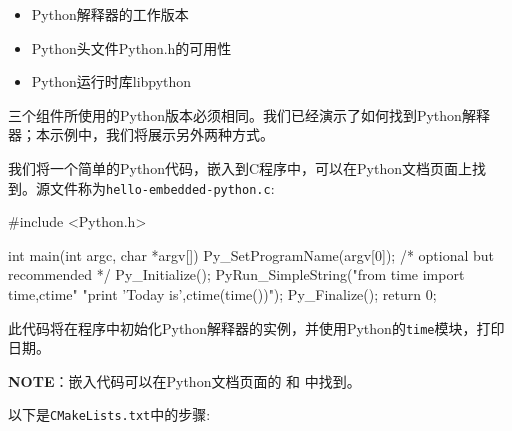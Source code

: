 \begin{itemize}
\item Python解释器的工作版本

\item Python头文件Python.h的可用性

\item Python运行时库libpython

\end{itemize}

三个组件所使用的Python版本必须相同。我们已经演示了如何找到Python解释器；本示例中，我们将展示另外两种方式。


我们将一个简单的Python代码，嵌入到C程序中，可以在Python文档页面上找到。源文件称为\texttt{hello-embedded-python.c}:

\begin{codebox}[c]
#include <Python.h>

int main(int argc, char *argv[]) {
  Py_SetProgramName(argv[0]); /* optional but recommended */
  Py_Initialize();
  PyRun_SimpleString("from time import time,ctime\n"
                     "print 'Today is',ctime(time())\n");
  Py_Finalize();
  return 0;
}
\end{codebox}

此代码将在程序中初始化Python解释器的实例，并使用Python的\texttt{time}模块，打印日期。

\begin{myInfoBox}
\textbf{NOTE}：嵌入代码可以在Python文档页面的  和  中找到。
\end{myInfoBox}


以下是\texttt{CMakeLists.txt}中的步骤:

